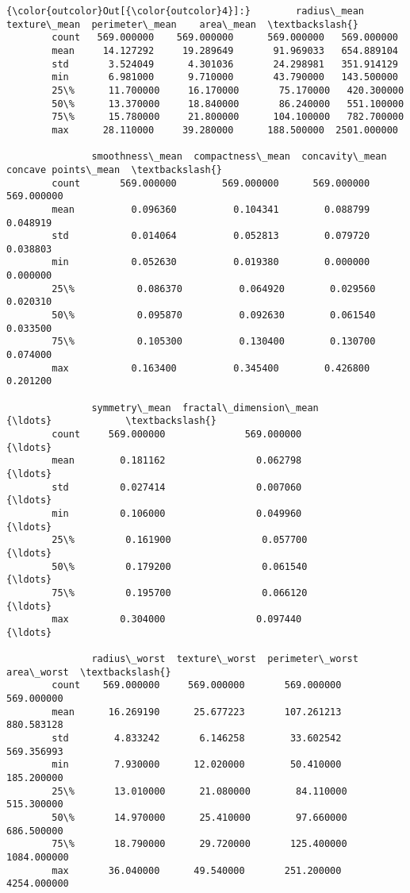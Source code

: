 \documentclass[11pt]{article}
\begin{document}
\begin{Verbatim}[commandchars=\\\{\}]
{\color{outcolor}Out[{\color{outcolor}4}]:}        radius\_mean  texture\_mean  perimeter\_mean    area\_mean  \textbackslash{}
        count   569.000000    569.000000      569.000000   569.000000   
        mean     14.127292     19.289649       91.969033   654.889104   
        std       3.524049      4.301036       24.298981   351.914129   
        min       6.981000      9.710000       43.790000   143.500000   
        25\%      11.700000     16.170000       75.170000   420.300000   
        50\%      13.370000     18.840000       86.240000   551.100000   
        75\%      15.780000     21.800000      104.100000   782.700000   
        max      28.110000     39.280000      188.500000  2501.000000   
        
               smoothness\_mean  compactness\_mean  concavity\_mean  concave points\_mean  \textbackslash{}
        count       569.000000        569.000000      569.000000           569.000000   
        mean          0.096360          0.104341        0.088799             0.048919   
        std           0.014064          0.052813        0.079720             0.038803   
        min           0.052630          0.019380        0.000000             0.000000   
        25\%           0.086370          0.064920        0.029560             0.020310   
        50\%           0.095870          0.092630        0.061540             0.033500   
        75\%           0.105300          0.130400        0.130700             0.074000   
        max           0.163400          0.345400        0.426800             0.201200   
        
               symmetry\_mean  fractal\_dimension\_mean           {\ldots}             \textbackslash{}
        count     569.000000              569.000000           {\ldots}              
        mean        0.181162                0.062798           {\ldots}              
        std         0.027414                0.007060           {\ldots}              
        min         0.106000                0.049960           {\ldots}              
        25\%         0.161900                0.057700           {\ldots}              
        50\%         0.179200                0.061540           {\ldots}              
        75\%         0.195700                0.066120           {\ldots}              
        max         0.304000                0.097440           {\ldots}              
        
               radius\_worst  texture\_worst  perimeter\_worst   area\_worst  \textbackslash{}
        count    569.000000     569.000000       569.000000   569.000000   
        mean      16.269190      25.677223       107.261213   880.583128   
        std        4.833242       6.146258        33.602542   569.356993   
        min        7.930000      12.020000        50.410000   185.200000   
        25\%       13.010000      21.080000        84.110000   515.300000   
        50\%       14.970000      25.410000        97.660000   686.500000   
        75\%       18.790000      29.720000       125.400000  1084.000000   
        max       36.040000      49.540000       251.200000  4254.000000   
        

\end{Verbatim}
\end{document}
